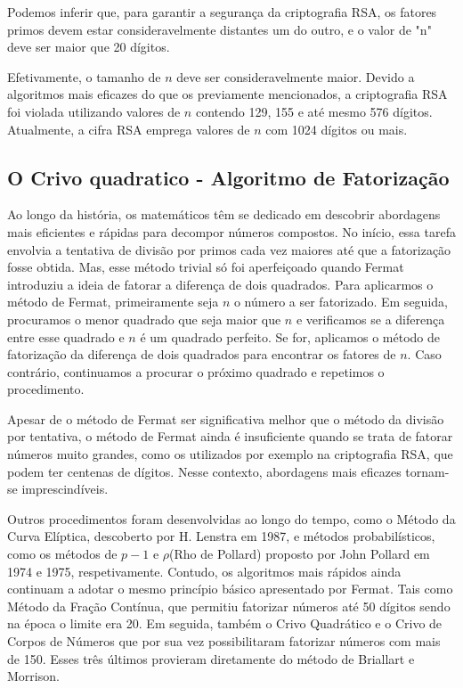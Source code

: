 Podemos inferir que, para garantir a segurança da criptografia RSA, os fatores primos devem estar consideravelmente distantes um do outro, e o valor de "n" deve ser maior que 20 dígitos\cite{Quaresma2009a}.

Efetivamente, o tamanho de $n$ deve ser consideravelmente maior. Devido a algoritmos mais eficazes do que os previamente mencionados, a criptografia RSA foi violada utilizando valores de $n$ contendo 129, 155 e até mesmo 576 dígitos. Atualmente, a cifra RSA emprega valores de $n$ com 1024 dígitos ou mais\cite{Quaresma2009a}.

\subsection{O Crivo quadratico - Algoritmo de Fatorização}

Ao longo da história, os matemáticos têm se dedicado em descobrir abordagens mais eficientes e rápidas para decompor números compostos.
No início, essa tarefa envolvia a tentativa de divisão por primos cada vez maiores até que a fatorização fosse obtida. Mas, esse método trivial só foi aperfeiçoado quando Fermat introduziu a ideia de fatorar a diferença de dois quadrados.
Para aplicarmos o método de Fermat, primeiramente seja $n$ o número a ser fatorizado. Em seguida, procuramos o menor quadrado que seja maior que $n$ e verificamos se a diferença entre esse quadrado e $n$ é um quadrado perfeito. Se for, aplicamos o método de fatorização da diferença de dois quadrados para encontrar os fatores de $n$. Caso contrário, continuamos a procurar  o próximo quadrado e repetimos o procedimento.

Apesar de o método de Fermat ser significativa melhor que o método da  divisão por  tentativa, o método de Fermat ainda é insuficiente quando se trata de fatorar números muito grandes, como os utilizados por exemplo na criptografia RSA, que podem ter centenas de dígitos. Nesse contexto, abordagens mais eficazes tornam-se imprescindíveis.

Outros procedimentos foram desenvolvidas ao longo do tempo, como o Método da Curva Elíptica, descoberto por H. Lenstra em 1987, e métodos probabilísticos, como os métodos de $p-1$ e $\rho$(Rho de Pollard) proposto por John Pollard em 1974 e 1975, respetivamente. Contudo, os algoritmos mais rápidos ainda continuam a adotar o mesmo princípio básico apresentado por Fermat. Tais como Método da Fração Contínua, que permitiu fatorizar números até 50 dígitos sendo na época o limite era 20.  Em seguida, também  o Crivo Quadrático e o Crivo de Corpos de Números que por sua vez possibilitaram fatorizar números com mais de 150.  Esses três últimos provieram diretamente do método de Briallart e Morrison.

